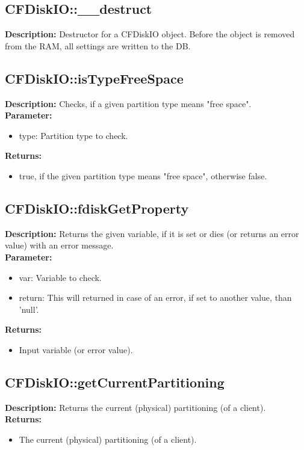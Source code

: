 \subsection{CFDiskIO::\_\_destruct}
\textbf{Description:} Destructor for a CFDiskIO object. Before the object is removed from the RAM, all settings are written to the DB.\\

\subsection{CFDiskIO::isTypeFreeSpace}
\textbf{Description:} Checks, if a given partition type means "free space".\\
\textbf{Parameter:}
\begin{itemize}
\item type: Partition type to check.
\end{itemize}
\textbf{Returns:}
\begin{itemize}
\item true, if the given partition type means "free space", otherwise false.
\end{itemize}

\subsection{CFDiskIO::fdiskGetProperty}
\textbf{Description:} Returns the given variable, if it is set or dies (or returns an error value) with an error message.\\
\textbf{Parameter:}
\begin{itemize}
\item var: Variable to check.
\item return: This will returned in case of an error, if set to another value, than 'null'.
\end{itemize}
\textbf{Returns:}
\begin{itemize}
\item Input variable (or error value).
\end{itemize}

\subsection{CFDiskIO::getCurrentPartitioning}
\textbf{Description:} Returns the current (physical) partitioning (of a client).\\
\textbf{Returns:}
\begin{itemize}
\item The current (physical) partitioning (of a client).
\end{itemize}

